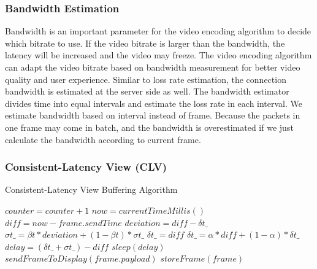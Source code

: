 \subsubsection{Bandwidth Estimation}
\label{sec_bandwidth}

Bandwidth is an important parameter for the video encoding algorithm
to decide which bitrate to use. 
If the video bitrate is larger than the bandwidth, 
the latency will be increased and the video may freeze.  
The video encoding algorithm can adapt the video bitrate
based on bandwidth measurement for better video quality 
and user experience. 
Similar to loss rate estimation, the connection bandwidth is estimated
at the server side as well. 
The bandwidth estimator divides time into equal intervals and 
estimate the loss rate in each interval. 
We estimate bandwidth based on interval instead of frame.
Because the packets in one frame may come in batch, 
and the bandwidth is overestimated if we just calculate
the bandwidth according to current frame. 

\subsubsection{Consistent-Latency View (CLV)}
\label{sec_clv}

  \begin{algorithm}[t]
   \caption{Consistent-Latency View Buffering Algorithm}
    \label{algorithm_clv}
    \begin{algorithmic}[1]
  \State $counter = counter + 1$
  \State $now = currentTimeMillis()$
  \State $diff = now - frame.sendTime$
    \State $deviation = diff - \delta{t}\_$
    \State $\sigma{t}\_ = \beta{t} * deviation + (1 - \beta{t}) * \sigma{t}\_$
  \EndIf
    \State $\delta{t}\_ = diff$
  \Else
    \State $\delta{t}\_ = \alpha * diff + (1 - \alpha) * \delta{t}\_$
  \EndIf
  \State $delay = (\delta{t}\_ + \sigma{t}\_) - diff$
    \State $sleep(delay)$
  \EndIf
  \State $sendFrameToDisplay(frame.payload)$
  \State $storeFrame(frame)$
\EndFunction
\end{algorithmic}
\end{algorithm}



